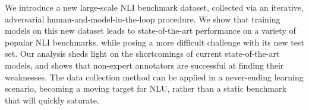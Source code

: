 We introduce a new large-scale NLI benchmark dataset, collected via an iterative, adversarial human-and-model-in-the-loop procedure. We show that training models on this new dataset leads to state-of-the-art performance on a variety of popular NLI benchmarks, while posing a more difficult challenge with its new test set. Our analysis sheds light on the shortcomings of current state-of-the-art models, and shows that non-expert annotators are successful at finding their weaknesses. The data collection method can be applied in a never-ending learning scenario, becoming a moving target for NLU, rather than a static benchmark that will quickly saturate.
